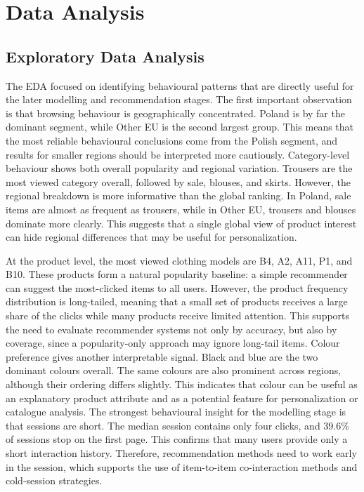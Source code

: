 \documentclass[a4paper,oneside,12pt]{book}
\begin{document}

\section{Data Analysis}
\subsection{Exploratory Data Analysis}

The EDA focused on identifying behavioural patterns that are directly useful for the later modelling and recommendation stages. The first important observation is that browsing behaviour is geographically concentrated. Poland is by far the dominant segment, while Other EU is the second largest group. This means that the most reliable behavioural conclusions come from the Polish segment, and results for smaller regions should be interpreted more cautiously. Category-level behaviour shows both overall popularity and regional variation. Trousers are the most viewed category overall, followed by sale, blouses, and skirts. However, the regional breakdown is more informative than the global ranking. In Poland, sale items are almost as frequent as trousers, while in Other EU, trousers and blouses dominate more clearly. This suggests that a single global view of product interest can hide regional differences that may be useful for personalization. 

At the product level, the most viewed clothing models are B4, A2, A11, P1, and B10. These products form a natural popularity baseline: a simple recommender can suggest the most-clicked items to all users. However, the product frequency distribution is long-tailed, meaning that a small set of products receives a large share of the clicks while many products receive limited attention. This supports the need to evaluate recommender systems not only by accuracy, but also by coverage, since a popularity-only approach may ignore long-tail items. Colour preference gives another interpretable signal. Black and blue are the two dominant colours overall. The same colours are also prominent across regions, although their ordering differs slightly. This indicates that colour can be useful as an explanatory product attribute and as a potential feature for personalization or catalogue analysis. The strongest behavioural insight for the modelling stage is that sessions are short. The median session contains only four clicks, and 39.6\% of sessions stop on the first page. This confirms that many users provide only a short interaction history. Therefore, recommendation methods need to work early in the session, which supports the use of item-to-item co-interaction methods and cold-session strategies. 
\end{document}
